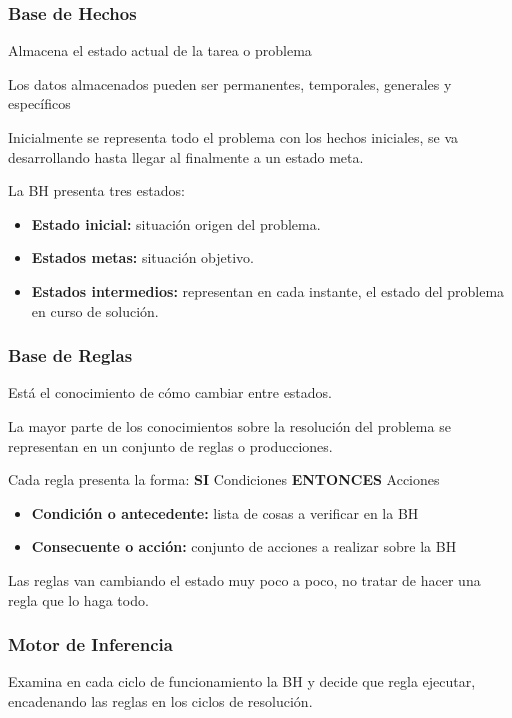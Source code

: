 \documentclass[12pt, twoside, openright]{report} %
\begin{document}
\subsubsection{Base de Hechos}
Almacena el estado actual de la tarea o problema

Los datos almacenados pueden ser permanentes, temporales, generales y específicos

Inicialmente se representa todo el problema con los hechos iniciales, se va desarrollando hasta llegar al finalmente a un estado meta.

La BH presenta tres estados:
\begin{itemize}
	\item \textbf{Estado inicial:} situación origen del problema.
	\item \textbf{Estados metas:} situación objetivo.
	\item \textbf{Estados intermedios:} representan en cada instante, el estado del problema en curso de solución.
\end{itemize}
\subsubsection{Base de Reglas}
Está el conocimiento de cómo cambiar entre estados.

La mayor parte de los conocimientos sobre la resolución del problema se representan en un conjunto de reglas o producciones.

Cada regla presenta la forma: \textbf{SI} Condiciones \textbf{ENTONCES} Acciones
\begin{itemize}
	\item \textbf{Condición o antecedente:} lista de cosas a verificar en la BH
	\item \textbf{Consecuente o acción:} conjunto de acciones a realizar sobre la BH
\end{itemize}

Las reglas van cambiando el estado muy poco a poco, no tratar de hacer una regla que lo haga todo.
\subsubsection{Motor de Inferencia}
Examina en cada ciclo de funcionamiento la BH y decide que regla ejecutar, encadenando las reglas en los ciclos de resolución.
\end{document}
